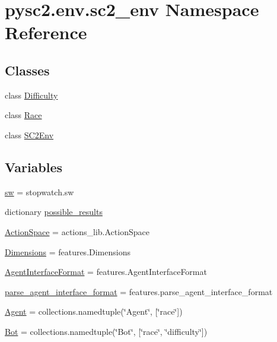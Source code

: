 \hypertarget{namespacepysc2_1_1env_1_1sc2__env}{}\section{pysc2.\+env.\+sc2\+\_\+env Namespace Reference}
\label{namespacepysc2_1_1env_1_1sc2__env}
\subsection*{Classes}
\begin{DoxyCompactItemize}
\item 
class \mbox{\hyperlink{classpysc2_1_1env_1_1sc2__env_1_1_difficulty}{Difficulty}}
\item 
class \mbox{\hyperlink{classpysc2_1_1env_1_1sc2__env_1_1_race}{Race}}
\item 
class \mbox{\hyperlink{classpysc2_1_1env_1_1sc2__env_1_1_s_c2_env}{S\+C2\+Env}}
\end{DoxyCompactItemize}
\subsection*{Variables}
\begin{DoxyCompactItemize}
\item 
\mbox{\hyperlink{namespacepysc2_1_1env_1_1sc2__env_a841ede07ac5c57ba50d466779e15be0d}{sw}} = stopwatch.\+sw
\item 
dictionary \mbox{\hyperlink{namespacepysc2_1_1env_1_1sc2__env_ad382d1020d678d6c22500f6cc39d92c8}{possible\+\_\+results}}
\item 
\mbox{\hyperlink{namespacepysc2_1_1env_1_1sc2__env_a8eec3d3e603fa33797611efcefa84651}{Action\+Space}} = actions\+\_\+lib.\+Action\+Space
\item 
\mbox{\hyperlink{namespacepysc2_1_1env_1_1sc2__env_a5491576d8402c644a9f252e24af50b83}{Dimensions}} = features.\+Dimensions
\item 
\mbox{\hyperlink{namespacepysc2_1_1env_1_1sc2__env_a23974fe1ec8ca094b260a877f21de1e9}{Agent\+Interface\+Format}} = features.\+Agent\+Interface\+Format
\item 
\mbox{\hyperlink{namespacepysc2_1_1env_1_1sc2__env_acadcfd286ccfe70e40ef888fd474b6c5}{parse\+\_\+agent\+\_\+interface\+\_\+format}} = features.\+parse\+\_\+agent\+\_\+interface\+\_\+format
\item 
\mbox{\hyperlink{namespacepysc2_1_1env_1_1sc2__env_a2e7053f7bfd9f28ddacc6454432eefd9}{Agent}} = collections.\+namedtuple(\char`\"{}Agent\char`\"{}, \mbox{[}\char`\"{}race\char`\"{}\mbox{]})
\item 
\mbox{\hyperlink{namespacepysc2_1_1env_1_1sc2__env_adcae68abde72c555b8e0412ea5bcb931}{Bot}} = collections.\+namedtuple(\char`\"{}Bot\char`\"{}, \mbox{[}\char`\"{}race\char`\"{}, \char`\"{}difficulty\char`\"{}\mbox{]})
\end{DoxyCompactItemize}


